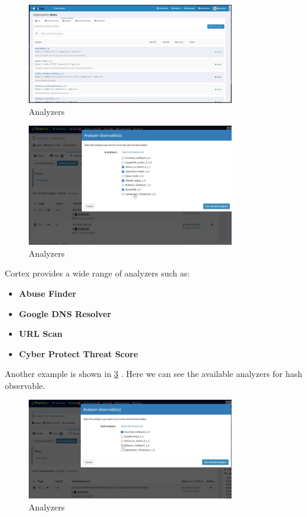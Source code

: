 \documentclass{article}
\begin{document}
\begin{figure}[H]
    \centering
    \includegraphics[width=0.8\textwidth]{img33.png}
    \caption{Analyzers}
    \label{fig:analyzersList}
\end{figure}

\begin{figure}[H]
    \centering
    \includegraphics[width=0.8\textwidth]{img30.png}
    \caption{Analyzers}
    \label{fig:analyzers}
\end{figure}

Cortex provides a wide range of analyzers such as:
\begin{itemize}
    \item \textbf{Abuse Finder}
    \item \textbf{Google DNS Resolver}
    \item \textbf{URL Scan}
    \item \textbf{Cyber Protect Threat Score}
\end{itemize}

Another example is shown in \ref{fig:analyzers2} . Here we can see the available analyzers for hash observable.
\begin{figure}[H]
    \centering
    \includegraphics[width=0.8\textwidth]{img29.png}
    \caption{Analyzers}
    \label{fig:analyzers2}
\end{figure}
\end{document}
